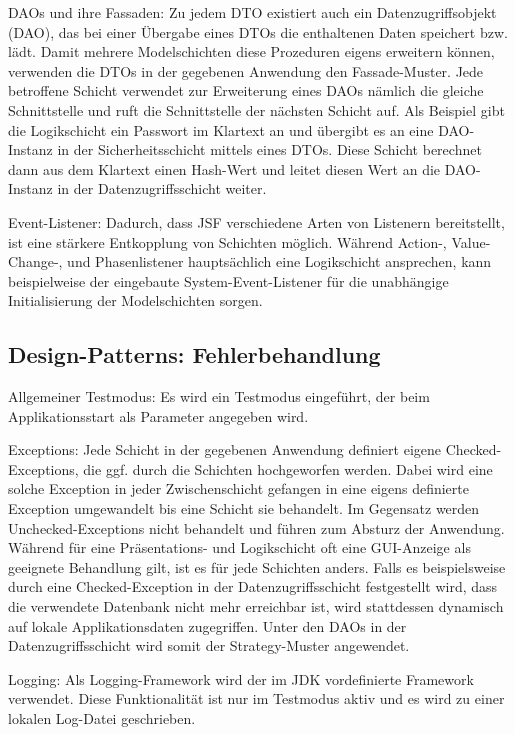 \documentclass{article}
\begin{document}
DAOs und ihre Fassaden: Zu jedem DTO existiert auch ein Datenzugriffsobjekt (DAO), das bei einer Übergabe eines DTOs die enthaltenen Daten speichert bzw. lädt. Damit mehrere Modelschichten diese Prozeduren eigens erweitern können, verwenden die DTOs in der gegebenen Anwendung den Fassade-Muster. Jede betroffene Schicht verwendet zur Erweiterung eines DAOs nämlich die gleiche Schnittstelle und ruft die Schnittstelle der nächsten Schicht auf. Als Beispiel gibt die Logikschicht ein Passwort im Klartext an und übergibt es an eine DAO-Instanz in der Sicherheitsschicht mittels eines DTOs. Diese Schicht berechnet dann aus dem Klartext einen Hash-Wert und leitet diesen Wert an die DAO-Instanz in der Datenzugriffsschicht weiter. \vspace{0.5em}

Event-Listener: Dadurch, dass JSF verschiedene Arten von Listenern bereitstellt, ist eine stärkere Entkopplung von Schichten möglich. Während Action-, Value-Change-, und Phasenlistener hauptsächlich eine Logikschicht ansprechen, kann beispielweise der eingebaute System-Event-Listener für die unabhängige Initialisierung der Modelschichten sorgen.

\subsection{Design-Patterns: Fehlerbehandlung}

Allgemeiner Testmodus: Es wird ein Testmodus eingeführt, der beim Applikationsstart als Parameter angegeben wird. \vspace{0.5em}

Exceptions: Jede Schicht in der gegebenen Anwendung definiert eigene Checked-Exceptions, die ggf. durch die Schichten hochgeworfen werden. Dabei wird eine solche Exception in jeder Zwischenschicht gefangen in eine eigens definierte Exception umgewandelt bis eine Schicht sie behandelt. Im Gegensatz werden Unchecked-Exceptions nicht behandelt und führen zum Absturz der Anwendung. Während für eine Präsentations- und Logikschicht oft eine GUI-Anzeige als geeignete Behandlung gilt, ist es für jede Schichten anders. Falls es beispielsweise durch eine Checked-Exception in der Datenzugriffsschicht festgestellt wird, dass die verwendete Datenbank nicht mehr erreichbar ist, wird stattdessen dynamisch auf lokale Applikationsdaten zugegriffen. Unter den DAOs in der Datenzugriffsschicht wird somit der Strategy-Muster angewendet. \vspace{0.5em}

Logging: Als Logging-Framework wird der im JDK vordefinierte Framework verwendet. Diese Funktionalität ist nur im Testmodus aktiv und es wird zu einer lokalen Log-Datei geschrieben. \vspace{0.5em}
\end{document}
